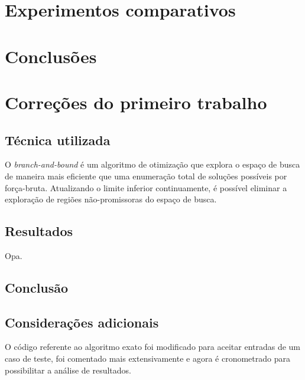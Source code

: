 \documentclass[12pt, a4paper]{article}
\begin{document}
\section{Experimentos comparativos}

\section{Conclusões}

\section{Correções do primeiro trabalho}
\subsection{Técnica utilizada}
O \emph{branch-and-bound} é um algoritmo de otimização que explora o espaço de
busca de maneira mais eficiente que uma enumeração total de soluções possíveis
por força-bruta.  Atualizando o limite inferior continuamente, é possível
eliminar a exploração de regiões não-promissoras do espaço de busca.

\subsection{Resultados}
Opa.

\subsection{Conclusão}
\subsection{Considerações adicionais}
O código referente ao algoritmo exato foi modificado para aceitar entradas de
um caso de teste, foi comentado mais extensivamente e agora é cronometrado para
possibilitar a análise de resultados.
\end{document}
